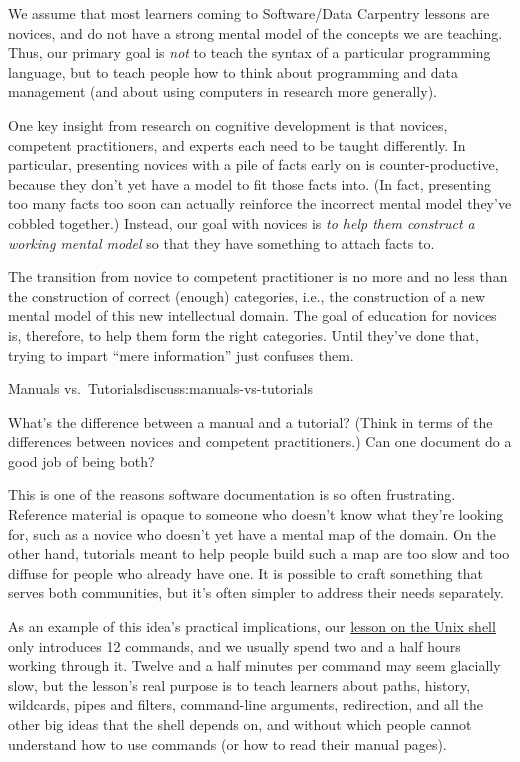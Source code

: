 We assume that most learners coming to Software/Data Carpentry lessons
are novices, and do not have a strong mental model of the concepts we
are teaching. Thus, our primary goal is \emph{not} to teach the syntax
of a particular programming language, but to teach people how to think
about programming and data management (and about using computers in
research more generally).

One key insight from research on cognitive development is that novices,
competent practitioners, and experts each need to be taught differently.
In particular, presenting novices with a pile of facts early on is
counter-productive, because they don't yet have a model to fit those
facts into. (In fact, presenting too many facts too soon can actually
reinforce the incorrect mental model they've cobbled together.) Instead,
our goal with novices is \emph{to help them construct a working mental
model} so that they have something to attach facts to.


The transition from novice to competent practitioner is no more and no
less than the construction of correct (enough) categories, i.e., the
construction of a new mental model of this new intellectual domain. The
goal of education for novices is, therefore, to help them form the right
categories. Until they've done that, trying to impart ``mere
information'' just confuses them.

\begin{discussion}{Manuals vs.~Tutorials}{discuss:manuals-vs-tutorials}

What's the difference between a manual and a tutorial? (Think in terms
of the differences between novices and competent practitioners.) Can one
document do a good job of being both?
\end{discussion}

This is one of the reasons software documentation is so often
frustrating. Reference material is opaque to someone who doesn't know
what they're looking for, such as a novice who doesn't yet have a mental
map of the domain. On the other hand, tutorials meant to help people
build such a map are too slow and too diffuse for people who already
have one. It is possible to craft something that serves both
communities, but it's often simpler to address their needs separately.

As an example of this idea's practical implications, our
\href{http://swcarpentry.github.io/shell-novice/}{lesson on the Unix
shell} only introduces 12 commands, and we usually spend two and a half
hours working through it. Twelve and a half minutes per command may seem
glacially slow, but the lesson's real purpose is to teach learners about
paths, history, wildcards, pipes and filters, command-line arguments,
redirection, and all the other big ideas that the shell depends on, and
without which people cannot understand how to use commands (or how to
read their manual pages).

